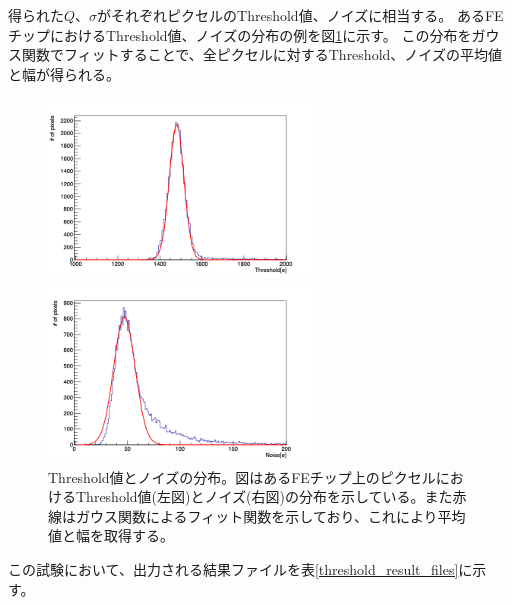 得られた$Q$、$\sigma$がそれぞれピクセルのThreshold値、ノイズに相当する。
あるFEチップにおけるThreshold値、ノイズの分布の例を図\ref{threshold_mean_sigma}に示す。
この分布をガウス関数でフィットすることで、全ピクセルに対するThreshold、ノイズの平均値と幅が得られる。

\begin{figure}[bpt]\centering
  \begin{minipage}{0.45\hsize}
    \includegraphics[width=7cm]{./data/analysis_result/Threshold_mean_dist.png}
  \end{minipage}
  \begin{minipage}{0.45\hsize}
    \includegraphics[width=7cm]{./data/analysis_result/Threshold_noise_dist.png}
  \end{minipage}
  \caption[Threshold値とノイズの分布。]{Threshold値とノイズの分布。図はあるFEチップ上のピクセルにおけるThreshold値(左図)とノイズ(右図)の分布を示している。また赤線はガウス関数によるフィット関数を示しており、これにより平均値と幅を取得する。}
  \label{threshold_mean_sigma}
\end{figure}

この試験において、出力される結果ファイルを表\ref{threshold_result_files}に示す。

